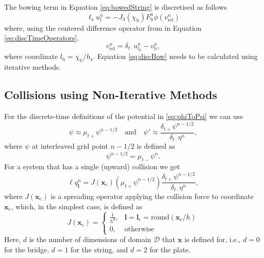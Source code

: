 \documentclass[dvipsnames, pdftex]{article}
\def\stringx{\chi}
\def\ugen{q}
\def\us{u}
\begin{document}
The bowing term in Equation \eqref{eq:bowedString} is discretised as follows
\begin{equation}
    \ell_\text{s}\us^n_l = -J_3(\stringx_\text{b})F_\text{b}^n\phi(v_\text{rel}^n)
\end{equation}
where, using the centered difference operator from in Equation \eqref{eq:discTimeOperators},
\begin{equation}\label{eq:discBow}
    v_\text{rel}^n = \delta_{t\cdot}\us_{l_\text{b}}^n-v_\text{b}^n,
\end{equation}
where coordinate $l_\text{b} = \stringx_\text{b}/h_\text{s}$. Equation \eqref{eq:discBow} needs to be calculated using iterative methods.

\subsection{Collisions using Non-Iterative Methods}

For the discrete-time definitions of the potential in \eqref{eq:phiToPsi} we can use 
\begin{equation}
    \psi\approx \mu_{t+}\psi^{n-1/2}\quad \text{and} \quad \psi' \approx \frac{\delta_{t+}\psi^{n-1/2}}{\delta_{t\cdot}\eta^n},
\end{equation}
where $\psi$ at interleaved grid point $n-1/2$ is defined as
\begin{equation}
    \psi^{n-1/2} = \mu_{t-}\psi^n.
\end{equation}
For a system that has a single (upward) collision we get
\begin{equation}\label{eq:dummySystem}
    \ell \ugen^n_{\boldsymbol{l}} = J(\boldsymbol{x}_\text{c})\left(\mu_{t+}\psi^{n-1/2}\right)\frac{\delta_{t+}\psi^{n-1/2}}{\delta_{t\cdot}\eta^n},
\end{equation}
where $J(\boldsymbol{x}_\text{c})$ is a spreading operator applying the collision force to coordinate $\boldsymbol{x}_\text{c}$, which, in the simplest case, is defined as \cite{bilbao2009numerical}
\begin{equation}
   J(\boldsymbol{x}_\text{c}) = \begin{cases}
       \frac{1}{h^d}, & \boldsymbol{l} = \boldsymbol{l}_\text{c} = \text{round}(\boldsymbol{x}_\text{c} / h)\\
       0, & \text{otherwise}
   \end{cases}
\end{equation}
Here, $d$ is the number of dimensions of domain $\mathcal{D}$ that $\boldsymbol{x}$ is defined for, i.e., $d=0$ for the bridge, $d=1$ for the string, and $d=2$ for the plate.
\end{document}
